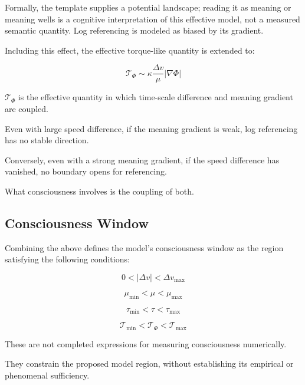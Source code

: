 Formally, the template supplies a potential landscape; reading it as meaning or meaning wells is a cognitive interpretation of this effective model, not a measured semantic quantity. Log referencing is modeled as biased by its gradient.

Including this effect, the effective torque-like quantity is extended to:

\begin{equation}
\mathcal{T}_{\Phi} \sim \kappa \frac{\Delta v}{\mu} \left|\nabla \Phi\right|
\end{equation}

$\mathcal{T}_{\Phi}$ is the effective quantity in which time-scale difference and meaning gradient are coupled.

Even with large speed difference, if the meaning gradient is weak, log referencing has no stable direction.

Conversely, even with a strong meaning gradient, if the speed difference has vanished, no boundary opens for referencing.

What consciousness involves is the coupling of both.

\subsection{Consciousness Window}


Combining the above defines the model's consciousness window as the region satisfying the following conditions:

\begin{equation}
0 < |\Delta v| < \Delta v_{\max}
\end{equation}

\begin{equation}
\mu_{\min} < \mu < \mu_{\max}
\end{equation}

\begin{equation}
\tau_{\min} < \tau < \tau_{\max}
\end{equation}

\begin{equation}
\mathcal{T}_{\min} < \mathcal{T}_{\Phi} < \mathcal{T}_{\max}
\end{equation}

These are not completed expressions for measuring consciousness numerically.

They constrain the proposed model region, without establishing its empirical or phenomenal sufficiency.

